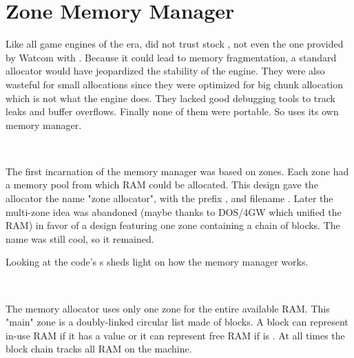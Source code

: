 \section{Zone Memory Manager}
Like all game engines of the era, \doom{} did not trust stock , not even the one provided by Watcom with . Because it could lead to memory fragmentation, a standard allocator would have jeopardized the stability of the engine. They were also wasteful for small allocations since they were optimized for big chunk allocation which is not what the engine does. They lacked good debugging tools to track leaks and buffer overflows. Finally none of them were portable. So \doom{} uses its own memory manager.\\
\par

\\
\par
The first incarnation of the memory manager was based on zones. Each zone had a memory pool from which RAM could be allocated. This design gave the allocator the name "zone allocator", with the prefix , and filename . Later the multi-zone idea was abandoned (maybe thanks to DOS/4GW which unified the RAM) in favor of a design featuring one zone containing a chain of blocks. The  name was still cool, so it remained.\\
\par
Looking at the code's s sheds light on how the memory manager works.\\
\par
{}\\
\par
The memory allocator uses only one zone for the entire available RAM. This "main" zone is a doubly-linked circular list made of blocks. A block can represent in-use RAM if it has a  value or it can represent free RAM if  is . At all times the block chain tracks all RAM on the machine.



